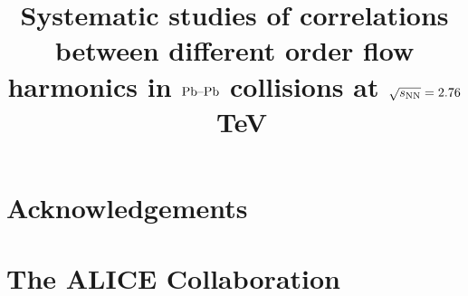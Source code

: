 \documentclass[ALICE,manyauthors]{cernphprep}
\begin{document}
%
%
\newcommand{\PbPb}{\textnormal{Pb--Pb}}
\newcommand{\AuAu}{\textnormal{Au--Au}}
\newcommand{\tn}[1]{\textnormal{#1}}
\newcommand{\snn}{\ensuremath{\sqrt{s_\tn{NN}}}}
\newcommand{\CKBNOTE}[1]{{\bf CKB:  #1}} 
\renewcommand{\CKBNOTE}[1]{}  %

\newcommand{\RHNOTE}[1]{{\bf RH:  #1}} 
\renewcommand{\RHNOTE}[1]{}  %

\begin{titlepage}
%
%
%
\title{Systematic studies of correlations between different order flow harmonics in $\PbPb$ collisions at $\snn = 2.76$~TeV}

%
%
\begin{abstract}

\end{abstract}
\end{titlepage}
\setcounter{page}{2}


\newenvironment{acknowledgement}{\relax}{\relax}
\begin{acknowledgement}
\section*{Acknowledgements}
\end{acknowledgement}
%
%
%
%


% 
%
%



\newpage
%
%
\appendix
\section{The ALICE Collaboration}
\label{app:collab}
%
\end{document}
